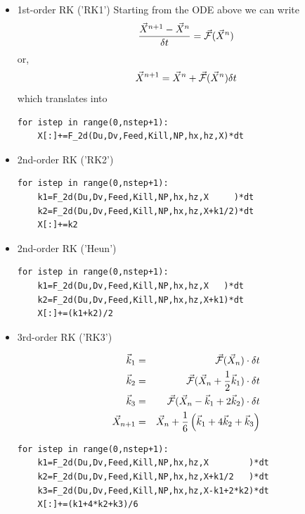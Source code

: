 \begin{itemize}

\item 1st-order RK ('RK1')
Starting from the ODE above we can write
\[
\frac{\vec{X}^{n+1} -\vec{X}^{n} }{\delta t} = \vec{\cal F} (\vec{X}^n)
\]
or, 
\[
\vec{X}^{n+1}
=
\vec{X}^{n} + \vec{\cal F} (\vec{X}^n) \delta t
\]
which translates into
\begin{lstlisting}
for istep in range(0,nstep+1):
    X[:]+=F_2d(Du,Dv,Feed,Kill,NP,hx,hz,X)*dt
\end{lstlisting}

\item 2nd-order RK ('RK2')
\begin{lstlisting}
for istep in range(0,nstep+1):
    k1=F_2d(Du,Dv,Feed,Kill,NP,hx,hz,X     )*dt
    k2=F_2d(Du,Dv,Feed,Kill,NP,hx,hz,X+k1/2)*dt
    X[:]+=k2
\end{lstlisting}

\item 2nd-order RK ('Heun')

\begin{lstlisting}
for istep in range(0,nstep+1):
    k1=F_2d(Du,Dv,Feed,Kill,NP,hx,hz,X   )*dt
    k2=F_2d(Du,Dv,Feed,Kill,NP,hx,hz,X+k1)*dt
    X[:]+=(k1+k2)/2
\end{lstlisting}



\item 3rd-order RK ('RK3')

\begin{eqnarray}
\vec{k}_1 &=& \vec{\cal F}(\vec{X}_n) \cdot \delta t\nonumber\\
\vec{k}_2 &=& \vec{\cal F}(\vec{X}_n+ \frac{1}{2} \vec{k}_1) \cdot \delta t \nonumber\\
\vec{k}_3 &=& \vec{\cal F}(\vec{X}_n -\vec{k}_1 +2\vec{k}_2) \cdot \delta t \nonumber\\
\vec{X}_{n+1} &=& \vec{X}_n + \frac{1}{6}\left(\vec{k}_1 + 4\vec{k}_2 + \vec{k}_3 \right)
\end{eqnarray}

\begin{lstlisting}
for istep in range(0,nstep+1):
    k1=F_2d(Du,Dv,Feed,Kill,NP,hx,hz,X        )*dt
    k2=F_2d(Du,Dv,Feed,Kill,NP,hx,hz,X+k1/2   )*dt
    k3=F_2d(Du,Dv,Feed,Kill,NP,hx,hz,X-k1+2*k2)*dt
    X[:]+=(k1+4*k2+k3)/6
\end{lstlisting}



\end{itemize}
